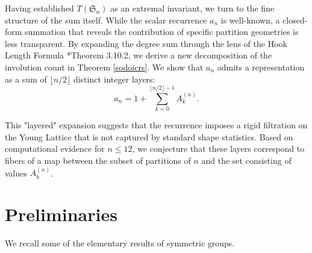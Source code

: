 \documentclass[oneside]{amsart}
\theoremstyle{plain}
\theoremstyle{definition}
\theoremstyle{remark}
\begin{document}
    Having established $T(\mathfrak{S}_n)$ as an extremal invariant, we turn to the fine structure of the sum itself. While the scalar recurrence $a_n$ is well-known, a closed-form summation that reveals the contribution of specific partition geometries is less transparent. By expanding the degree sum through the lens of the Hook Length Formula \cite{MR1824028}*{Theorem 3.10.2}, we derive a new decomposition of the involution count in Theorem \ref{sodoicrs}. We show that $a_n$ admits a representation as a sum of $\lfloor n/2 \rfloor$ distinct integer layers:
    \[ a_n = 1 + \sum_{k=0}^{\lfloor n/2 \rfloor - 1} A_k^{(n)}. \]
    
    This "layered" expansion suggests that the recurrence imposes a rigid filtration on the Young Lattice that is not captured by standard shape statistics. Based on computational evidence for $n \le 12$, we conjecture that these layers correspond to fibers of a map between the subset of partitions of $n$ and the set consisting of values $A_k^{(n)}$. 
\section{Preliminaries}
    We recall some of the elementary results of symmetric groups.
\end{document}
